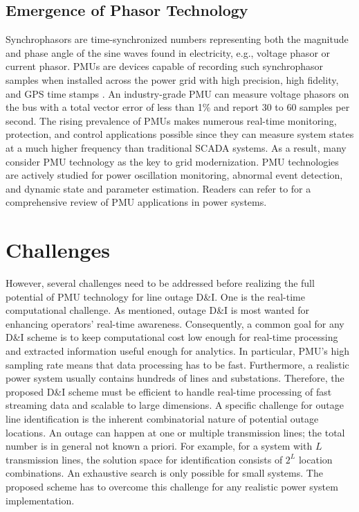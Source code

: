 \subsection{Emergence of Phasor Technology}
Synchrophasors are time-synchronized numbers representing both the magnitude and phase angle of the sine waves found in electricity, e.g., voltage phasor or current phasor. PMUs are devices capable of recording such synchrophasor samples when installed across the power grid with high precision, high fidelity, and GPS time stamps \cite{Aminifar2014}. An industry-grade PMU can measure voltage phasors on the bus with a total vector error of less than 1\% and report 30 to 60 samples per second. The rising prevalence of PMUs makes numerous real-time monitoring, protection, and control applications possible since they can measure system states at a much higher frequency than traditional SCADA systems. As a result, many consider PMU technology as the key to grid modernization. PMU technologies are actively studied for power oscillation monitoring, abnormal event detection, and dynamic state and parameter estimation. Readers can refer to \cite{Aminifar2014} for a comprehensive review of PMU applications in power systems.


\section{Challenges}
However, several challenges need to be addressed before realizing the full potential of PMU technology for line outage D\&I. 
One is the real-time computational challenge. As mentioned, outage D\&I is most wanted for enhancing operators’ real-time awareness. Consequently, a common goal for any D\&I scheme is to keep computational cost low enough for real-time processing and extracted information useful enough for analytics.
In particular, PMU’s high sampling rate means that data processing has to be fast. Furthermore, a realistic power system usually contains hundreds of lines and substations. Therefore, the proposed D\&I scheme must be efficient to handle real-time processing of fast streaming data and scalable to large dimensions.
A specific challenge for outage line identification is the inherent combinatorial nature of potential outage locations. An outage can happen at one or multiple transmission lines; the total number is in general not known a priori. For example, for a system with $L$ transmission lines, the solution space for identification consists of $2^L$ location combinations. An exhaustive search is only possible for small systems. The proposed scheme has to overcome this challenge for any realistic power system implementation.


